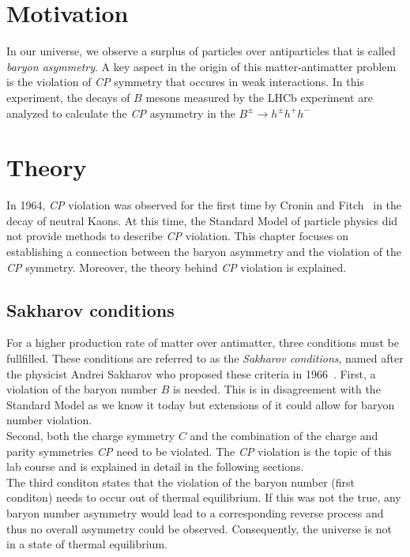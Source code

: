 \section{Motivation}
In our universe, we observe a surplus of particles over antiparticles that is called \textit{baryon asymmetry}. A key aspect in the origin of this matter-antimatter 
problem is the violation of \textit{CP} symmetry that occures in weak interactions. In this experiment, the decays of $B$ mesons measured by the LHCb experiment
are analyzed to calculate the \textit{CP} asymmetry in the $B^{\pm} \rightarrow h^\pm h^+ h^-$

\section{Theory}
\label{sec:Theory}
In 1964, \textit{CP} violation was observed for the first time by Cronin and Fitch~\cite{Cronin_Fitch_cpv} in the decay of neutral Kaons. At this time, the Standard Model of 
particle physics did not provide methods to describe \textit{CP} violation. This chapter focuses on establishing a connection between the baryon asymmetry
and the violation of the \textit{CP} symmetry. Moreover, the theory behind \textit{CP} violation is explained.

\subsection{Sakharov conditions}
\label{sec:sakharov_conditions}
For a higher production rate of matter over antimatter, three conditions must be fullfilled. These conditions are referred to as the \textit{Sakharov conditions},
named after the physicist Andrei Sakharov who proposed these criteria in 1966~\cite{Sakharov_conditions}.
First, a violation of the baryon number $B$ is needed. This is in disagreement with the Standard Model as we know it today but extensions of it could
allow for baryon number violation. \\
Second, both the charge symmetry $C$ and the combination of the charge and parity symmetries \textit{CP} need to be violated. The \textit{CP} violation is the topic
of this lab course and is explained in detail in the following sections. \\
The third conditon states that the violation of the baryon number (first conditon) needs to occur out of thermal equilibrium. If this was not the true, any 
baryon number asymmetry would lead to a corresponding reverse process and thus no overall asymmetry could be observed. Consequently, the universe is not in
a state of thermal equilibrium.

